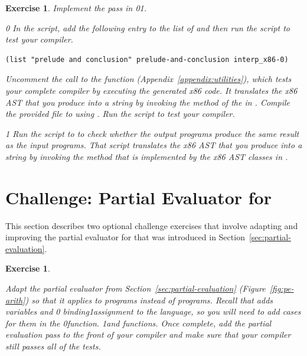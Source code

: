 \documentclass[7x10,nocrop]{TimesAPriori_MIT}%
\def\racketEd{0}
\def\pythonEd{1}
\def\edition{0}
\newcommand{\racket}[1]{{\if\edition\racketEd{#1}\fi}}
\newcommand{\python}[1]{{\if\edition\pythonEd #1\fi}}
\newtheorem{exercise}[theorem]{Exercise}
\begin{document}
\begin{exercise}\normalfont\normalsize
%
Implement the  pass in
\racket{}\python{}.
%
{\if\edition\racketEd
In the  script, add the following entry to the
list of  and then run the script to test your compiler.
\begin{lstlisting}
(list "prelude and conclusion" prelude-and-conclusion interp_x86-0)
\end{lstlisting}
%  
Uncomment the call to the  function
(Appendix~\ref{appendix:utilities}), which tests your complete
compiler by executing the generated x86 code. It translates the x86
AST that you produce into a string by invoking the 
method of the  in . Compile
the provided  file to  using
. Run the script to test your compiler.
%
\fi}
{\if\edition\pythonEd
%
Run the  script to to check whether the output
programs produce the same result as the input programs. That script
translates the x86 AST that you produce into a string by invoking the
 method that is implemented by the x86 AST classes in
.
%
\fi}

\end{exercise}


\section{Challenge: Partial Evaluator for \LangVar{}}
\label{sec:pe-Lvar}

This section describes two optional challenge exercises that involve
adapting and improving the partial evaluator for \LangInt{} that was
introduced in Section~\ref{sec:partial-evaluation}.

\begin{exercise}\label{ex:pe-Lvar}
\normalfont\normalsize
  
Adapt the partial evaluator from Section~\ref{sec:partial-evaluation}
(Figure~\ref{fig:pe-arith}) so that it applies to \LangVar{} programs
instead of \LangInt{} programs. Recall that \LangVar{} adds variables and
%
\racket{ binding}\python{assignment}
%
to the \LangInt{} language, so you will need to add cases for them in
the 
%
\racket{function.}
%
\python{and  functions.}
%
Once complete, add the partial evaluation pass to the front of your
compiler and make sure that your compiler still passes all of the
tests.
\end{exercise}
\end{document}
